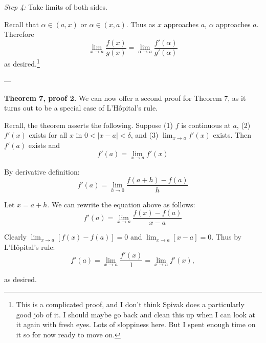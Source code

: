 \textit{Step 4:} Take limits of both sides.

\vs

Recall that $\alpha\in(a,x)$ or $\alpha\in(x,a)$. Thus as $x$ approaches $a$, $\alpha$
approaches $a$. Therefore
\[\lim_{x\to a}\frac{f(x)}{g(x)}=\lim_{\alpha\to a}\frac{f'(\alpha)}{g'(\alpha)}\]
as desired.\footnote{This is a complicated proof, and I don't think
  Spivak does a particularly good job of it. I should maybe go back
  and clean this up when I can look at it again with fresh eyes. Lots
  of sloppiness here. But I spent enough time on it so for now ready
  to move on.}

\vs---\vs

\textbf{Theorem 7, proof 2.} We can now offer a second proof for
Theorem 7, as it turns out to be a special case of L'H\^opital's rule.

\vs

Recall, the theorem asserts the following. Suppose (1) $f$ is
continuous at $a$, (2) $f'(x)$ exists for all $x$ in $0<|x-a|<\delta$, and
(3) $\lim_{x\to a}f'(x)$ exists. Then $f'(a)$ exists and
\[f'(a)=\lim_{x\to a}f'(x)\]

\vs

By derivative definition:
\[f'(a)=\lim_{h\to0}\frac{f(a+h)-f(a)}{h}\]

Let $x=a+h$. We can rewrite the equation above as follows:
\[f'(a)=\lim_{x\to a}\frac{f(x)-f(a)}{x-a}\]

Clearly $\lim_{x\to a}[f(x)-f(a)]=0$ and $\lim_{x\to a}[x-a]=0$. Thus by
L'H\^opital's rule:
\[f'(a)=\lim_{x\to a}\frac{f'(x)}{1}=\lim_{x\to a}f'(x),\]

as desired.


